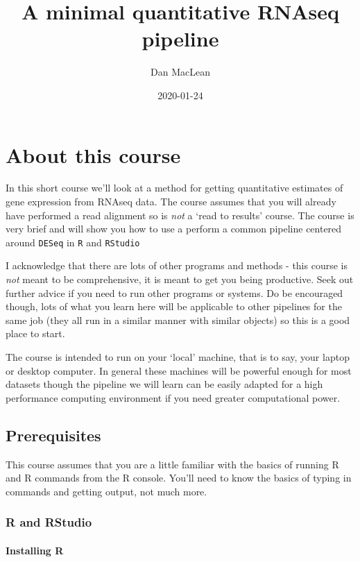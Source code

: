 \documentclass[]{book}
\title{A minimal quantitative RNAseq pipeline}
\author{Dan MacLean}
\date{2020-01-24}
\begin{document}
\maketitle

{
\setcounter{tocdepth}{1}
\tableofcontents
}
\hypertarget{about-this-course}{%
\chapter{About this course}\label{about-this-course}}

In this short course we'll look at a method for getting quantitative estimates of gene expression from RNAseq data. The course assumes that you will already have performed a read alignment so is \emph{not} a `read to results' course. The course is very brief and will show you how to use a perform a common pipeline centered around \texttt{DESeq} in \texttt{R} and \texttt{RStudio}

I acknowledge that there are lots of other programs and methods - this course is \emph{not} meant to be comprehensive, it is meant to get you being productive. Seek out further advice if you need to run other programs or systems. Do be encouraged though, lots of what you learn here will be applicable to other pipelines for the same job (they all run in a similar manner with similar objects) so this is a good place to start.

The course is intended to run on your `local' machine, that is to say, your laptop or desktop computer. In general these machines will be powerful enough for most datasets though the pipeline we will learn can be easily adapted for a high performance computing environment if you need greater computational power.

\hypertarget{prerequisites}{%
\section{Prerequisites}\label{prerequisites}}

This course assumes that you are a little familiar with the basics of running R and R commands from the R console. You'll need to know the basics of typing in commands and getting output, not much more.

\hypertarget{r-and-rstudio}{%
\subsection{R and RStudio}\label{r-and-rstudio}}

\hypertarget{installing-r}{%
\subsubsection{Installing R}\label{installing-r}}
\end{document}
